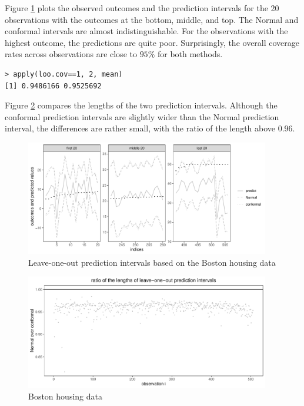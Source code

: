 Figure \ref{fig::pi-boston-housing-conformal} plots the observed outcomes and the prediction intervals for the 20 observations with the outcomes at the bottom, middle, and top. The Normal and conformal intervals are almost indistinguishable. For the observations with the highest outcome, the predictions are quite poor. Surprisingly, the overall coverage rates across observations are close to $95\%$ for both methods. 
\begin{lstlisting}
> apply(loo.cov==1, 2, mean)
[1] 0.9486166 0.9525692
\end{lstlisting}

Figure \ref{fig::ratio-boston-housing-conformal} compares the lengths of the two prediction intervals. Although the conformal prediction intervals are slightly wider than the Normal prediction interval, the differences are rather small, with the ratio of the length above 0.96.


\begin{figure}
\centering
\includegraphics[width = 0.95\textwidth]{figures/GCprediction_intervals.pdf}
\caption{Leave-one-out prediction intervals based on the Boston housing data}\label{fig::pi-boston-housing-conformal}
\end{figure}




\begin{figure}
\centering
\includegraphics[width = 0.95\textwidth]{figures/GaussianConformalLOOpred.pdf}
\caption{Boston housing data}\label{fig::ratio-boston-housing-conformal}
\end{figure}


